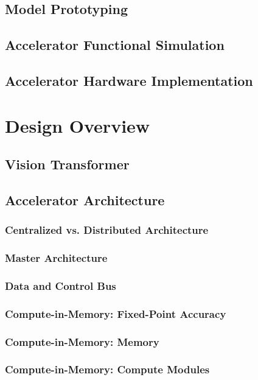 \documentclass[12pt, hidelinks]{article}
\begin{document}
\subsection{Model Prototyping}
\lipsum[1]
\subsection{Accelerator Functional Simulation}
\lipsum[1]
\subsection{Accelerator Hardware Implementation}
\lipsum[1]

\newpage
\section{Design Overview}
\lipsum[1]

\subsection{Vision Transformer}
\lipsum[1]
\subsection{Accelerator Architecture}
\subsubsection{Centralized vs. Distributed Architecture}
\subsubsection{Master Architecture}
\subsubsection{Data and Control Bus}
\subsubsection{Compute-in-Memory: Fixed-Point Accuracy}
\subsubsection{Compute-in-Memory: Memory}
\subsubsection{Compute-in-Memory: Compute Modules}
\end{document}
